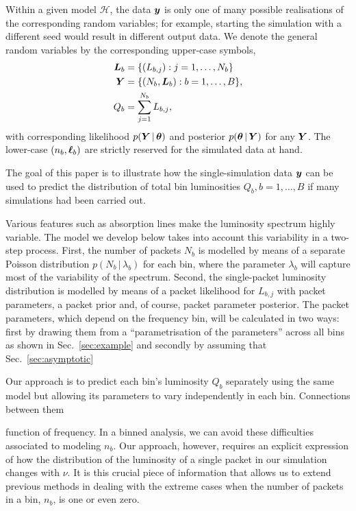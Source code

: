 \documentclass[11pt]{article}
\newcommand{\hypo}  {{\mathcal{H}}}  %
\newcommand{\cond}{\,|\,}
\newcommand{\refsec}[1]{Sec.~\ref{sec:#1}}
\newcommand{\Lumtot}{Q}
\newcommand{\Lum}{L}
\begin{document}
Within a given model $\hypo$, the data ${\bm{y}}$ is only one of many
possible realisations of the corresponding random variables; for
example, starting the simulation with a different seed would result in
different output data. We denote the general random variables by the
corresponding upper-case symbols,
\begin{align}
  \bmL_b &= \{(\Lum_{b,j}): j = 1,\ldots,N_b\}\\
  \bmY &= \{(N_b, \bmL_b): b = 1,\ldots,B\},\\
  \Lumtot_b &= \sum_{j=1}^{N_b} \Lum_{b,j},
\end{align}
with corresponding likelihood $p(\bmY\cond\bmtheta)$ and posterior
$p(\bmtheta\cond\bmY)$ for any ${\bm{Y}}$. The lower-case $(n_b,{\bm{\ell}}_b)$
are strictly reserved for the simulated data at hand.


The goal of this paper is to illustrate how the single-simulation data
${\bm{y}}$ can be used to predict the distribution of total bin
luminosities $Q_b, b = 1,\ldots,B$ if many simulations had been
carried out. 


Various features such as absorption lines make the luminosity spectrum
highly variable. The model we develop below takes into account this
variability in a two-step process. First, the number of packets $N_b$
is modelled by means of a separate Poisson distribution
$p(N_b\cond\lambda_b)$ for each bin, where the parameter $\lambda_b$
will capture most of the variability of the spectrum.  Second, the
single-packet luminosity distribution is modelled by means of a packet
likelihood for $\Lum_{b,j}$ with packet parameters, a packet prior and,
of course, packet parameter posterior. The packet parameters, which
depend on the frequency bin, will be calculated in two ways: first by
drawing them from a ``parametrisation of the parameters'' across all
bins as shown in \refsec{example} and secondly by assuming that
\refsec{asymptotic}



Our approach
is to predict each bin's luminosity $Q_b$ separately using the same
model but allowing its parameters to vary independently in each bin.
Connections between them 


function of frequency. In a binned analysis, we can avoid these
difficulties associated to modeling $n_b$. Our approach, however,
requires an explicit expression of how the distribution of the
luminosity of a single packet in our simulation changes with $\nu$. It
is this crucial piece of information that allows us to extend previous
methods in dealing with the extreme cases when the number of packets
in a bin, $n_b$, is one or even zero.
\end{document}
